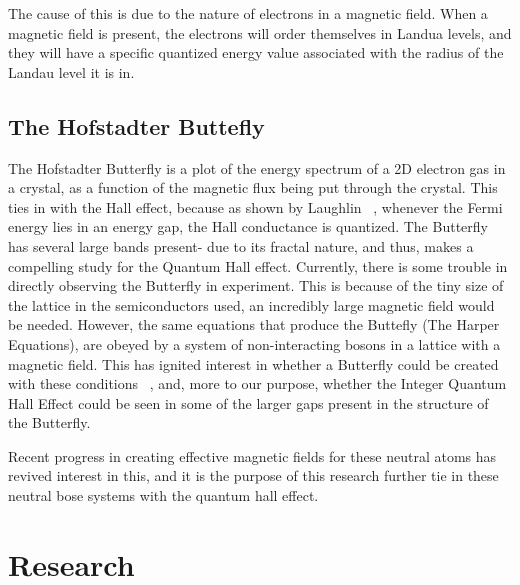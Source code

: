 \documentclass[12pt]{article}
\begin{document}
The cause of this is due to the nature of electrons in a magnetic field.
When a magnetic field is present, the electrons will order themselves in Landua levels,
and they will have a specific quantized energy value associated with the radius of the
Landau level it is in.


\subsection{The Hofstadter Buttefly}
The Hofstadter Butterfly is a plot of the energy spectrum of a 2D electron gas in a
crystal, as a function of the magnetic flux being put through the crystal.
This ties in with the Hall effect, because as shown by Laughlin~\cite{LAUGHLIN1981} %
, whenever the Fermi energy lies in an energy gap, the Hall conductance is quantized. The Butterfly
has several large bands present- due to its fractal nature, and thus, makes a compelling study 
for the Quantum Hall effect.
Currently, there is some trouble in directly observing the Butterfly in 
experiment. This is because of the tiny size of the lattice in the semiconductors used,
an incredibly large magnetic field would be needed.
However, the same equations that produce the Buttefly (The Harper Equations), are obeyed by a
system of non-interacting bosons in a lattice with a magnetic field.
This has ignited interest in whether a Butterfly could be created with these conditions
~\cite{ZOLLER2003}, and, more to our purpose, whether the Integer Quantum Hall Effect could be
seen in some of the larger gaps present in the structure of the Butterfly.

Recent progress in creating effective magnetic fields for these neutral atoms has revived interest
in this, and it is the purpose of this research further tie in these neutral bose systems with
the quantum hall effect.

\section{Research}
\end{document}
